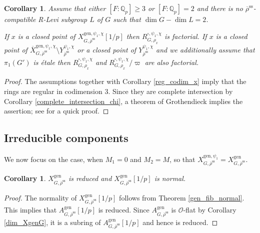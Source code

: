\documentclass{amsart}
\newtheorem{cor}[prop]{Corollary}
\theoremstyle{definition}
\theoremstyle{remark}
\newcommand{\Qp}{\mathbb {Q}_p}
\newcommand{\OO}{\mathcal O}
\newcommand{\rhobar}{\overline{\rho}}
\newcommand{\gen}{\mathrm{gen}}
\newcommand{\Xbar}{\overline{X}}
\newcommand{\rhobarss}{\rhobar^{\mathrm{ss}}}
\begin{document}
\begin{cor}\label{parafactorial} 
Assume that  either $[F:\Qp]\ge 3$ or 
 $[F:\Qp]=2$ and there is no $\rhobarss$-compatible R-Levi subgroup $L$ of $G$ such that $\dim G -\dim L=2$.
 
If $x$ is a closed point of $X^{\gen,\psi_1,\chi}_{G, \rhobarss}[1/p]$ then  $R^{\square, \psi_1,\chi}_{G, \rho_x}$ is factorial. If $x$ is a closed point of
$\Xbar^{\gen,\psi_1,\chi}_{G, \rhobarss}\setminus Y_{\rhobarss}^{\psi_1,\chi}$ 
or  a closed point of $Y^{\psi_1,\chi}_{\rhobarss}$ and we additionally assume that $\pi_1(G')$ is \'etale then  $R^{\square, \psi_1,\chi}_{G, \rho_x}$ and 
$R^{\square, \psi_1,\chi}_{G, \rho_x}/\varpi$ are also factorial. 
\end{cor} 
\begin{proof} The assumptions together with Corollary \ref{reg_codim_x} imply that the rings 
are regular in codimension $3$. Since they are complete intersection by Corollary \ref{complete_intersection_chi}, 
a theorem of Grothendieck implies the assertion; see \cite{R3_factorial} for a quick proof. 
\end{proof}

\subsection{Irreducible components} We now focus on the case, when $M_1=0$ 
and $M_2=M$, so that $X^{\gen,\psi_1}_{G, \rhobarss}=X^{\gen}_{G, \rhobarss}$.

\begin{cor} $X^{\gen}_{G, \rhobarss}$ is reduced and $X^{\gen}_{G, \rhobarss}[1/p]$ is normal.
\end{cor} 
\begin{proof} The normality of $X^{\gen}_{G, \rhobarss}[1/p]$ follows from Theorem \ref{gen_fib_normal}.
This implies that $A^{\gen}_{G, \rhobarss}[1/p]$ is reduced. Since $A^{\gen}_{G, \rhobarss}$ is $\OO$-flat by Corollary \ref{dim_XgenG}, 
it is a subring of $A^{\gen}_{G, \rhobarss}[1/p]$ and hence is reduced.
\end{proof} 
\end{document}
